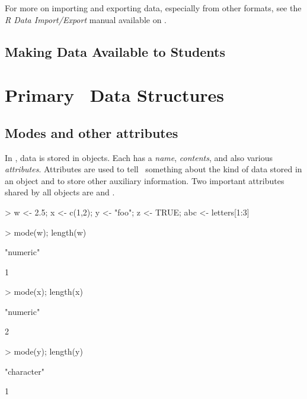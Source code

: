 For more on importing and exporting data, especially from other
formats, see the 
\textit{R Data Import/Export} manual available on \cran.

\subsection{Making Data Available to Students}

%

\section{Primary \R\ Data Structures}

\subsection{Modes and other attributes} %
In \R, data is stored in objects.  Each  
has a \emph{name}, \emph{contents}, and also various \emph{attributes}.
Attributes are used to tell \R\ something about the kind
of data stored in an object and to store other auxiliary information.  
Two important attributes shared 
by all objects are  and .

%
%
%
%
\Rindex{[ ]}%

\begin{Schunk}
\begin{Sinput}
> w <- 2.5; x <- c(1,2); y <- "foo"; z <- TRUE; abc <- letters[1:3]
\end{Sinput}
\end{Schunk}

\begin{Schunk}
\begin{Sinput}
> mode(w); length(w)
\end{Sinput}
\begin{Soutput}
[1] "numeric"
\end{Soutput}
\begin{Soutput}
[1] 1
\end{Soutput}
\begin{Sinput}
> mode(x); length(x)
\end{Sinput}
\begin{Soutput}
[1] "numeric"
\end{Soutput}
\begin{Soutput}
[1] 2
\end{Soutput}
\begin{Sinput}
> mode(y); length(y)
\end{Sinput}
\begin{Soutput}
[1] "character"
\end{Soutput}
\begin{Soutput}
[1] 1
\end{Soutput}
\end{Schunk}

